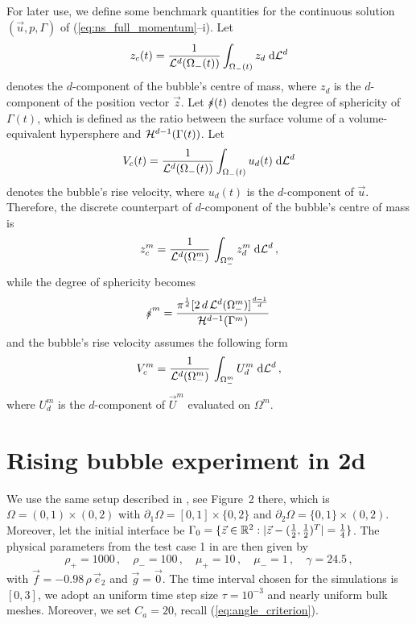 For later use, we define some benchmark quantities for the continuous
solution $(\vec u, p, \Gamma)$ of (\ref{eq:ns_full_momentum}--i). Let
\begin{equation}
z_c(t) = \frac{1}{\mathcal{L}^d(\Omega_-(t))}\int_{\Omega_-(t)} z_d \;{\rm d}{\cal L}^{d}
\end{equation}
denotes the $d$-component of the bubble's centre of mass, where $z_d$ is the
$d$-component of the position vector $\vec z$. Let $\mbox{$s\!\!\!\!\:/$}(t)$ denotes the
degree of sphericity of $\Gamma(t)$, which is defined as the ratio between the
surface volume of a volume-equivalent hypersphere and $\mathcal{H}^{d-1}(\Gamma(t))$. Let
\begin{equation}
V_c(t) = \frac{1}{\mathcal{L}^d(\Omega_-(t))}\int_{\Omega_-(t)} u_d(t) \;{\rm d}{\cal L}^{d}
\end{equation}
denotes the bubble's rise velocity, where $u_d(t)$ is the $d$-component of
$\vec u$. Therefore, the discrete counterpart of $d$-component of the bubble's
centre of mass is
\begin{equation}
z_c^m = \frac{1}{\mathcal{L}^d(\Omega_-^m)}\,\int_{\Omega_-^m} z_d^{m} \;{\rm d}{\cal L}^{d}\,,
\end{equation}
while the degree of sphericity becomes
\begin{equation}
\mbox{$s\!\!\!\!\:/$}^m =\frac{\pi^{\frac{1}{d}}[2\,d\,\mathcal{L}^d(\Omega_-^m)]^\frac{d-1}{d}}
{\mathcal{H}^{d-1}(\Gamma^m)}\,
\end{equation}
and the bubble's rise velocity assumes the following form
\begin{equation}
V^m_c = \frac{1}{\mathcal{L}^d(\Omega_-^m)}\,\int_{\Omega_-^m}U^m_d\;{\rm d}{\cal L}^{d}\,,
\end{equation}
where $U^m_d$ is the $d$-component of $\vec U^m$ evaluated on $\Omega^m$.

\section{Rising bubble experiment in 2d}\label{sec:2d_rising_bubble_results}
We use the same  setup described in \cite{HysingTKPBGT09}, see Figure~2 there,
which is ${\Omega = (0,1) \times (0,2)}$ with $\partial_1\Omega = [0,1] \times
\{0,2\}$ and $\partial_2\Omega = \{0,1\} \times (0,2)$. Moreover, let the
initial interface be ${\Gamma_0 = \{\vec z \in \mathbb R^2 : |\vec z - (\frac{1}{2},
\frac{1}{2})^T| = \frac{1}{4}\}}$. The physical parameters from the test case 1
in \cite[Table~I]{HysingTKPBGT09} are then given by
\begin{equation} \label{eq:Hysing1}
\rho_+ = 1000\,,\quad \rho_- = 100\,,\quad \mu_+ = 10\,,\quad \mu_- = 1\,,\quad
\gamma = 24.5\,,
\end{equation}
with $\vec f = -0.98\,\rho\,\vec e_2$ and $\vec g=\vec 0$. The time interval
chosen for the simulations is $[0,3]$, we adopt an uniform time step size
$\tau=10^{-3}$ and nearly uniform bulk meshes. Moreover, we set
$C_a=20$\textdegree, recall (\ref{eq:angle_criterion}).

